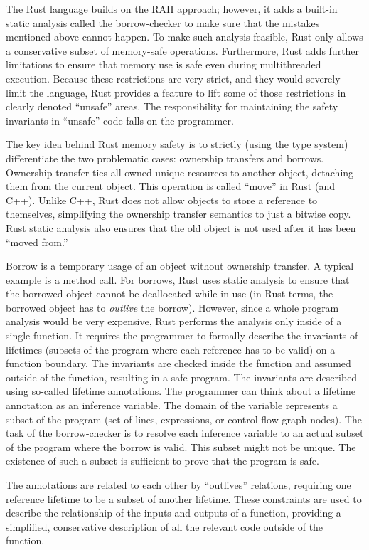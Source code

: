 \documentclass[
  11pt,
  twoside,symmetric]{report}
\begin{document}
The Rust language builds on the RAII approach; however, it adds a
built-in static analysis called the borrow-checker to make sure that the
mistakes mentioned above cannot happen. To make such analysis feasible,
Rust only allows a conservative subset of memory-safe operations.
Furthermore, Rust adds further limitations to ensure that memory use is
safe even during multithreaded execution. Because these restrictions are
very strict, and they would severely limit the language, Rust provides a
feature to lift some of those restrictions in clearly denoted ``unsafe''
areas. The responsibility for maintaining the safety invariants in
``unsafe'' code falls on the programmer.

The key idea behind Rust memory safety is to strictly (using the type
system) differentiate the two problematic cases: ownership transfers and
borrows. Ownership transfer ties all owned unique resources to another
object, detaching them from the current object. This operation is called
``move'' in Rust (and C++). Unlike C++, Rust does not allow objects to
store a reference to themselves, simplifying the ownership transfer
semantics to just a bitwise copy. Rust static analysis also ensures that
the old object is not used after it has been ``moved from.''

Borrow is a temporary usage of an object without ownership transfer. A
typical example is a method call. For borrows, Rust uses static analysis
to ensure that the borrowed object cannot be deallocated while in use
(in Rust terms, the borrowed object has to \emph{outlive} the borrow).
However, since a whole program analysis would be very expensive, Rust
performs the analysis only inside of a single function. It requires the
programmer to formally describe the invariants of lifetimes (subsets of
the program where each reference has to be valid) on a function
boundary. The invariants are checked inside the function and assumed
outside of the function, resulting in a safe program. The invariants are
described using so-called lifetime annotations. The programmer can think
about a lifetime annotation as an inference variable. The domain of the
variable represents a subset of the program (set of lines, expressions,
or control flow graph nodes). The task of the borrow-checker is to
resolve each inference variable to an actual subset of the program where
the borrow is valid. This subset might not be unique. The existence of
such a subset is sufficient to prove that the program is safe.

The annotations are related to each other by ``outlives'' relations,
requiring one reference lifetime to be a subset of another lifetime.
These constraints are used to describe the relationship of the inputs
and outputs of a function, providing a simplified, conservative
description of all the relevant code outside of the function.
\end{document}

